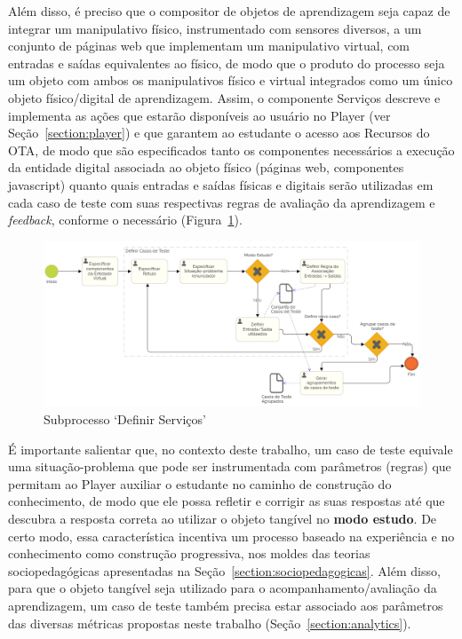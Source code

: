 Além disso, é preciso que o compositor de objetos de aprendizagem seja capaz de integrar um manipulativo físico, instrumentado com sensores diversos, a um conjunto de páginas web que implementam um manipulativo virtual, com entradas e saídas equivalentes ao físico, de modo que o produto do processo seja um objeto com ambos os manipulativos físico e virtual integrados como um único objeto físico/digital de aprendizagem. Assim, o componente Serviços descreve e implementa as ações que estarão disponíveis ao usuário no Player (ver Seção~\ref{section:player}) e que garantem ao estudante o acesso aos Recursos do OTA, de modo que são especificados tanto os componentes necessários a execução da entidade digital associada ao objeto físico (páginas web, componentes javascript) quanto quais entradas e saídas físicas e digitais serão utilizadas em cada caso de teste com suas respectivas regras de avaliação da aprendizagem e \textit{feedback}, conforme o necessário (Figura~\ref{fig:bpmn_ofva_casos}).

\begin{figure}[htb]
	\centering
	\includegraphics[width=0.9\linewidth]{chapters/proposedMethod/bpmn_servicos.png}
	\caption{Subprocesso `Definir Serviços'}
	\label{fig:bpmn_ofva_casos}
\end{figure}

É importante salientar que, no contexto deste trabalho, um caso de teste equivale uma situação-problema que pode ser instrumentada com parâmetros (regras) que permitam ao Player auxiliar o estudante no caminho de construção do conhecimento, de modo que ele possa refletir e corrigir as suas respostas até que descubra a resposta correta ao utilizar o objeto tangível no \textbf{modo estudo}. De certo modo, essa característica incentiva um processo baseado na experiência e no conhecimento como construção progressiva, nos moldes das teorias sociopedagógicas apresentadas na Seção~\ref{section:sociopedagogicas}. Além disso, para que o objeto tangível seja utilizado para o acompanhamento/avaliação da aprendizagem, um caso de teste também precisa estar associado aos parâmetros das diversas métricas propostas neste trabalho (Seção~\ref{section:analytics}).

